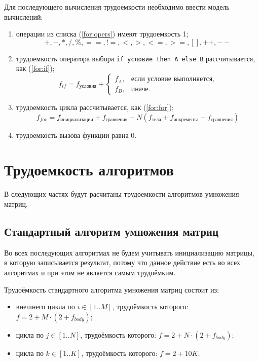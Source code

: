 \documentclass[a4paper,14pt, unknownkeysallowed]{extreport}
\newcommand{\code}[1]{\texttt{#1}}
\begin{document}
Для последующего вычисления трудоемкости необходимо ввести модель вычислений:
\begin{enumerate}
	\item операции из списка (\ref{for:opers}) имеют трудоемкость 1;
	\begin{equation}
		\label{for:opers}
		+, -, *, /, \%, ==, !=, <, >, <=, >=, [], ++, {-}-
	\end{equation}
	\item трудоемкость оператора выбора \code{if условие then A else B} рассчитывается, как (\ref{for:if});
	\begin{equation}
		\label{for:if}
		f_{if} = f_{\text{условия}} +
		\begin{cases}
			f_A, & \text{если условие выполняется,}\\
			f_B, & \text{иначе.}
		\end{cases}
	\end{equation}
	\item трудоемкость цикла рассчитывается, как (\ref{for:for});
	\begin{equation}
		\label{for:for}
		f_{for} = f_{\text{инициализации}} + f_{\text{сравнения}} + N(f_{\text{тела}} + f_{\text{инкремента}} + f_{\text{сравнения}})
	\end{equation}
	\item трудоемкость вызова функции равна 0.
\end{enumerate}


\section{Трудоемкость алгоритмов}

В следующих частях будут расчитаны трудоемкости алгоритмов умножения матриц.

\subsection{Стандартный алгоритм умножения матриц}

Во всех последующих алгоритмах не будем учитывать инициализацию матрицы, в которую записывается результат, потому что данное действие есть во всех алгоритмах и при этом не является самым трудоёмким.

Трудоёмкость стандартного алгоритма умножения матриц состоит из:
\begin{itemize}
	\item внешнего цикла по $i \in [1..M]$, трудоёмкость которого: $f = 2 + M \cdot (2 + f_{body})$;
	\item цикла по $j \in [1..N]$, трудоёмкость которого: $f = 2 + N \cdot (2 + f_{body})$;
	\item цикла по $k \in [1..K]$, трудоёмкость которого: $f = 2 + 10K$;
\end{itemize}
\end{document}
